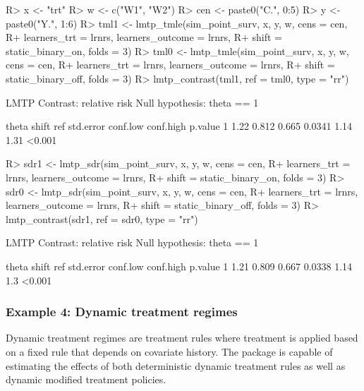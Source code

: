 \documentclass[]{jss}
\begin{document}
\begin{CodeChunk}

\begin{CodeInput}
R> x <- "trt"
R> w <- c("W1", "W2")
R> cen <- paste0("C.", 0:5)
R> y <- paste0("Y.", 1:6)
R> tml1 <- lmtp_tmle(sim_point_surv, x, y, w, cens = cen, 
R+                   learners_trt = lrnrs, learners_outcome = lrnrs,
R+                   shift = static_binary_on, folds = 3)
R> tml0 <- lmtp_tmle(sim_point_surv, x, y, w, cens = cen, 
R+                   learners_trt = lrnrs, learners_outcome = lrnrs,
R+                   shift = static_binary_off, folds = 3)
R> lmtp_contrast(tml1, ref = tml0, type = "rr")
\end{CodeInput}

\begin{CodeOutput}
  LMTP Contrast: relative risk
Null hypothesis: theta == 1

  theta shift   ref std.error conf.low conf.high p.value
1  1.22 0.812 0.665    0.0341     1.14      1.31  <0.001
\end{CodeOutput}

\begin{CodeInput}
R> sdr1 <- lmtp_sdr(sim_point_surv, x, y, w, cens = cen, 
R+                 learners_trt = lrnrs, learners_outcome = lrnrs,
R+                 shift = static_binary_on, folds = 3)
R> sdr0 <- lmtp_sdr(sim_point_surv, x, y, w, cens = cen, 
R+                 learners_trt = lrnrs, learners_outcome = lrnrs,
R+                 shift = static_binary_off, folds = 3)
R> lmtp_contrast(sdr1, ref = sdr0, type = "rr")
\end{CodeInput}

\begin{CodeOutput}
  LMTP Contrast: relative risk
Null hypothesis: theta == 1

  theta shift   ref std.error conf.low conf.high p.value
1  1.21 0.809 0.667    0.0338     1.14       1.3  <0.001
\end{CodeOutput}

\end{CodeChunk}

\hypertarget{example-4-dynamic-treatment-regimes}{%
\subsubsection{Example 4: Dynamic treatment regimes}\label{example-4-dynamic-treatment-regimes}}

Dynamic treatment regimes are treatment rules where treatment is applied based on a fixed rule that depends on covariate history. The  package is capable of estimating the effects of both deterministic dynamic treatment rules as well as dynamic modified treatment policies. 
\end{document}
